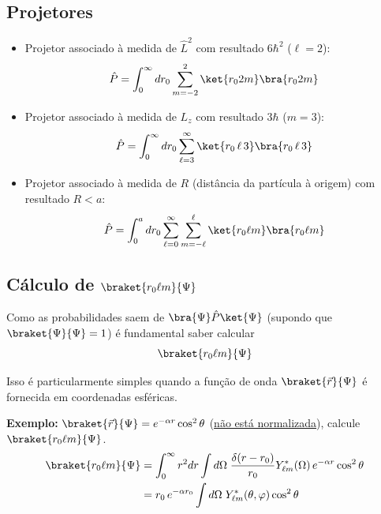 \subsection*{Projetores}

\begin{itemize}
    \item Projetor associado à medida de $\hat{L}^2$ com resultado $6\hbar^2$ ($\ell=2$):
    \begin{equation}
        \hat{P} = \int_0^\infty dr_0 \sum_{m=-2}^{2} \ket{r_0 2 m}\bra{r_0 2 m}
    \label{eq:aula22_projetor_L2}
    \end{equation}

    \item Projetor associado à medida de $L_z$ com resultado $3\hbar$ ($m=3$):
    \begin{equation}
        \hat{P} = \int_0^\infty dr_0 \sum_{\ell=3}^{\infty} \ket{r_0\,\ell\,3}\bra{r_0\,\ell\,3}
    \label{eq:aula22_projetor_Lz}
    \end{equation}

    \item Projetor associado à medida de $R$ (distância da partícula à origem) com resultado $R < a$:
    \begin{equation}
        \hat{P} = \int_0^a dr_0 \sum_{\ell=0}^{\infty}\sum_{m=-\ell}^{\ell} \ket{r_0\ell m}\bra{r_0\ell m}
    \label{eq:aula22_projetor_R}
    \end{equation}
\end{itemize}


\subsection*{Cálculo de $\braket{r_0\ell m}{\Psi}$}

Como as probabilidades saem de $\bra{\Psi}\hat{P}\ket{\Psi}$ (supondo que $\braket{\Psi}{\Psi}=1$) é fundamental saber calcular
\begin{equation}
    \braket{r_0\ell m}{\Psi}
\label{eq:aula22_braket_r0lm_psi}
\end{equation}

Isso é particularmente simples quando a função de onda $\braket{\vec{r}}{\Psi}$ é fornecida em coordenadas esféricas.

\textbf{Exemplo:} $\braket{\vec{r}}{\Psi} = e^{-\alpha r}\cos^2\theta$ (\underline{não está normalizada}), calcule $\braket{r_0\ell m}{\Psi}$.
\begin{align}
    \braket{r_0\ell m}{\Psi} &= \int_0^\infty r^2 dr \int d\Omega \; \frac{\delta(r-r_0)}{r_0}Y_{\ell m}^*(\Omega)\,e^{-\alpha r}\cos^2\theta \notag \\
    &= r_0\,e^{-\alpha r_0}\int d\Omega \; Y_{\ell m}^*(\theta,\varphi)\cos^2\theta
\label{eq:aula22_exemplo_braket_r0lm}
\end{align}

